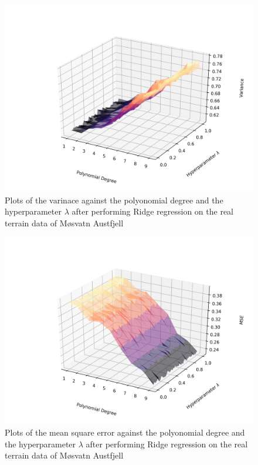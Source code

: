 \documentclass[a4paper,10pt,english]{article}
\begin{document}
\begin{figure}[H]
	\centering 
	\includegraphics[scale=0.6]{../real_output/part_D_1.png}
	\caption{
		Plots of the varinace against the polyonomial degree and the hyperparameter $\lambda$ after performing Ridge regression on the real terrain data of Møsvatn Austfjell
	}
	\label{part_g_d1}
\end{figure}

\begin{figure}[H]
	\centering 
	\includegraphics[scale=0.6]{../real_output/part_D_2.png}
	\caption{
		Plots of the mean square error against the polyonomial degree and the hyperparameter $\lambda$ after performing Ridge regression on the real terrain data of Møsvatn Austfjell 
	}
	\label{part_g_d2}
\end{figure}
\end{document}
